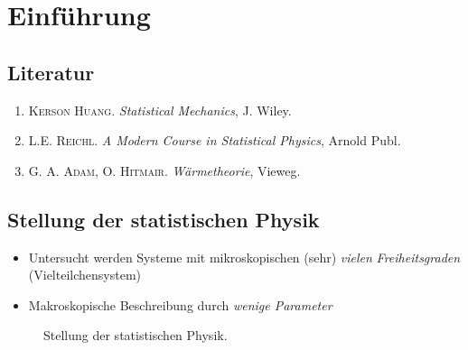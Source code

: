 \section{Einführung}
\subsection{Literatur}
\begin{enumerate}
    \item \textsc{Kerson Huang}. \emph{Statistical Mechanics}, J. Wiley.
    \item \textsc{L.E. Reichl}. \emph{A Modern Course in Statistical Physics}, Arnold Publ.
    \item \textsc{G. A. Adam, O. Hitmair}. \emph{Wärmetheorie}, Vieweg.
\end{enumerate}

\subsection{Stellung der statistischen Physik}
\begin{itemize}
    \item Untersucht werden Systeme mit mikroskopischen (sehr) \emph{vielen} \emph{Freiheitsgraden} \\
    (Vielteilchensystem)
    \item Makroskopische Beschreibung durch \emph{wenige Parameter}
\end{itemize}
\begin{figure}[H]
    \centering
    \def\svgwidth{0.7\textwidth}
    
    \caption{Stellung der statistischen Physik.}
    \label{img:position_statphys}
\end{figure}